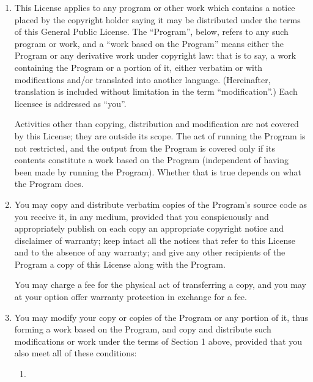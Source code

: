 \documentclass{article}
\begin{document}
\begin{enumerate}

\addtocounter{enumi}{-1}

\item 

This License applies to any program or other work which contains a notice
placed by the copyright holder saying it may be distributed under the
terms of this General Public License.  The ``Program'', below, refers to
any such program or work, and a ``work based on the Program'' means either
the Program or any derivative work under copyright law: that is to say, a
work containing the Program or a portion of it, either verbatim or with
modifications and/or translated into another language.  (Hereinafter,
translation is included without limitation in the term ``modification''.)
Each licensee is addressed as ``you''.

Activities other than copying, distribution and modification are not
covered by this License; they are outside its scope.  The act of
running the Program is not restricted, and the output from the Program
is covered only if its contents constitute a work based on the
Program (independent of having been made by running the Program).
Whether that is true depends on what the Program does.

\item You may copy and distribute verbatim copies of the Program's source
  code as you receive it, in any medium, provided that you conspicuously
  and appropriately publish on each copy an appropriate copyright notice
  and disclaimer of warranty; keep intact all the notices that refer to
  this License and to the absence of any warranty; and give any other
  recipients of the Program a copy of this License along with the Program.

You may charge a fee for the physical act of transferring a copy, and you
may at your option offer warranty protection in exchange for a fee.

\item

You may modify your copy or copies of the Program or any portion
of it, thus forming a work based on the Program, and copy and
distribute such modifications or work under the terms of Section 1
above, provided that you also meet all of these conditions:

\begin{enumerate}

\item 


\end{enumerate}
\end{enumerate}
\end{document}
